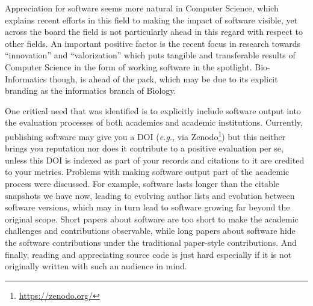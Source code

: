 \documentclass[a4paper,UKenglish]{dagrep}
\newcommand{\eg}{\emph{e.g.},\xspace}
\begin{document}
Appreciation for software seems more natural in Computer Science, which explains recent efforts in this field to making the impact of software visible, yet across the board the field is not particularly ahead in this regard with respect to other fields. An important positive factor is the recent focus in research towards ``innovation'' and ``valorization'' which puts tangible and transferable results of Computer Science in the form of working software in the spotlight. Bio-Informatics though, is ahead of the pack, which may be due to its explicit branding as the informatics branch of Biology.

One critical need that was identified is to explicitly include software output into the evaluation processes of both academics and academic institutions. Currently, publishing software may give you a DOI (\eg via Zenodo\footnote{\url{https://zenodo.org/}}) but this neither brings you reputation nor does it contribute to a positive evaluation per se, unless this DOI is indexed as part of your records and citations to it are credited to your metrics.
Problems with making software output part of the academic process were discussed. For example, software lasts longer than the citable snapshots we have now, leading to evolving author lists and evolution between software versions, which may in turn lead to software growing far beyond the original scope. Short papers about software are too short to make the academic challenges and contributions observable, while long papers about software hide the software contributions under the traditional paper-style contributions. And finally, reading and appreciating source code is just hard especially if it is not originally written with such an audience in mind.
\end{document}
